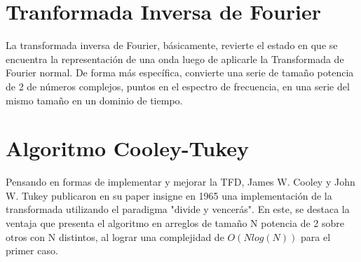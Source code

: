 \documentclass[review,1p]{elsarticle}
\begin{document}
  

\section{Tranformada Inversa de Fourier}
La transformada inversa de Fourier, básicamente, revierte el estado en que se encuentra la representación de una onda luego de aplicarle la Transformada de Fourier normal. De forma más específica, convierte una serie de tamaño potencia de 2 de números complejos, puntos en el espectro de frecuencia, en una serie del mismo tamaño en un dominio de tiempo.
\section{Algoritmo Cooley-Tukey}
Pensando en formas de implementar y mejorar la TFD, James W. Cooley y John W. Tukey publicaron en su paper insigne en 1965 una implementación de la transformada utilizando el paradigma "divide y vencerás". En este, se destaca la ventaja que presenta el algoritmo en arreglos de tamaño N potencia de 2 sobre otros con N distintos, al lograr una complejidad de $O(Nlog(N))$ para el primer caso. \\
\end{document}
